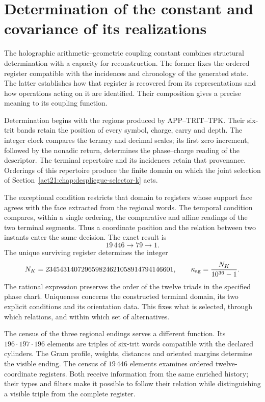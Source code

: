 \section{Determination of the constant and covariance of its realizations}
\label{act21:centralidad-constante}

The holographic arithmetic--geometric coupling constant combines
structural determination with a capacity for reconstruction. The former
fixes the ordered register compatible with the incidences and chronology
of the generated state. The latter establishes how that register is
recovered from its representations and how operations acting on it are
identified. Their composition gives a precise meaning to its coupling
function.

Determination begins with the regions produced by APP--TRIT--TPK. Their
six-trit bands retain the position of every symbol, charge, carry and
depth. The integer clock compares the ternary and decimal scales; its
first zero increment, followed by the nonadic return, determines the
phase--charge reading of the descriptor. The terminal repertoire and its
incidences retain that provenance. Orderings of this repertoire produce
the finite domain on which the joint selection of
Section~\ref{act21:chap:despliegue-selector-k} acts.

The exceptional condition restricts that domain to registers whose
support face agrees with the face extracted from the regional words.
The temporal condition compares, within a single ordering, the
comparative and affine readings of the two terminal segments. Thus a
coordinate position and the relation between two instants enter the same
decision. The exact result is
\[
 19\,446\longrightarrow79\longrightarrow1.
\]
The unique surviving register determines the integer
\[
 N_K=234543140729659824621058914794146601,
 \qquad
 \kappa_{\rm ag}=\frac{N_K}{10^{36}-1}.
\]
The rational expression preserves the order of the twelve triads in the
specified phase chart. Uniqueness concerns the constructed terminal
domain, its two explicit conditions and its orientation data. This fixes
what is selected, through which relations, and within which set of
alternatives.

The census of the three regional endings serves a different function.
Its \(196\cdot197\cdot196\) elements are triples of six-trit words
compatible with the declared cylinders. The Gram profile, weights,
distances and oriented margins determine the visible ending. The census
of \(19\,446\) elements examines ordered twelve-coordinate registers.
Both receive information from the same enriched history; their types and
filters make it possible to follow their relation while distinguishing
a visible triple from the complete register.


